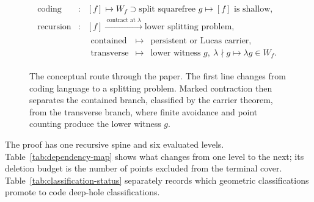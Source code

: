 \begin{figure}[H]
\centering
\[
\begin{array}{rcl}
\text{coding}
 &:& [f]\longmapsto W_f\supset\text{split squarefree }g
      \longmapsto [f]\text{ is shallow},\\[4pt]
\text{recursion}
 &:& [f]\xrightarrow{\ \text{contract at }\lambda\ }
      \text{lower splitting problem},\\[2pt]
&&\begin{array}{rcl}
\text{contained}&\longmapsto&\text{persistent or Lucas carrier},\\
\text{transverse}&\longmapsto&
 \text{lower witness }g,\ \lambda\nmid g
 \longmapsto \lambda g\in W_f .
\end{array}
\end{array}
\]
\caption{The conceptual route through the paper.  The first line changes
from coding language to a splitting problem.  Marked contraction then
separates the contained branch, classified by the carrier theorem, from the
transverse branch, where finite avoidance and point counting produce the
lower witness \(g\).}
\label{fig:polar-flow}
\end{figure}

The proof has one recursive spine and six evaluated levels.
Table~\ref{tab:dependency-map} shows what changes from one level to the next;
its deletion budget is the number of points excluded from the terminal cover.
Table~\ref{tab:classification-status} separately records which geometric
classifications promote to code deep-hole classifications.

